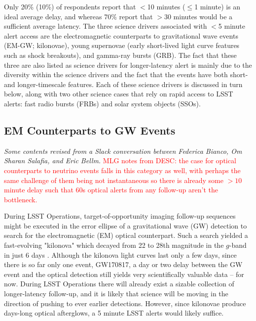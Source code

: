 \documentclass[DM,lsstdraft,authoryear,toc]{lsstdoc}
\begin{document}
Only 20\% (10\%) of respondents report that $<$10 minutes ($\leq$1 minute) is an ideal average delay, and whereas 70\% report that $>$30 minutes would be a sufficient average latency.
The three science drivers associated with $<$5 minute alert access are the electromagnetic counterparts to gravitational wave events (EM-GW; kilonovae), young supernovae (early short-lived light curve features such as shock breakouts), and gamma-ray bursts (GRB).
The fact that these three are also listed as science drivers for longer-latency alert is mainly due to the diversity within the science drivers and the fact that the events have both short- and longer-timescale features.
Each of these science drivers is discussed in turn below, along with two other science cases that rely on rapid access to LSST alerts: fast radio bursts (FRBs) and solar system objects (SSOs).

\subsection{EM Counterparts to GW Events}\label{ssec:latency_emgw}
{\it Some contents revised from a Slack conversation between Federica Bianco, Om Sharan Salafia, and Eric Bellm.} \textcolor{red}{MLG notes from DESC: the case for optical counterparts to neutrino events falls in this category as well, with perhaps the same challenge of them being not instantaneous so there is already some $>10$ minute delay such that 60s optical alerts from any follow-up aren't the bottleneck.}

During LSST Operations, target-of-opportunity imaging follow-up sequences might be executed in the error ellipse of a gravitational wave (GW) detection to search for the electromagnetic (EM) optical counterpart.
Such a search yielded a fast-evolving "kilonova" which decayed from 22 to 28th magnitude in the $g$-band in just 6 days \citep[faster in the bluer and slower in the redder filters][]{2017Sci...358.1559K}.
Although the kilonova light curves last only a few days, since there is so far only one event, GW170817, a day or two delay between the GW event and the optical detection still yields very scientifically valuable data -- for now.
During LSST Operations there will already exist a sizable collection of longer-latency follow-up, and it is likely that science will be moving in the direction of pushing to ever earlier detections.
However, since kilonovae produce days-long optical afterglows, a 5 minute LSST alerts would likely suffice.
\end{document}
